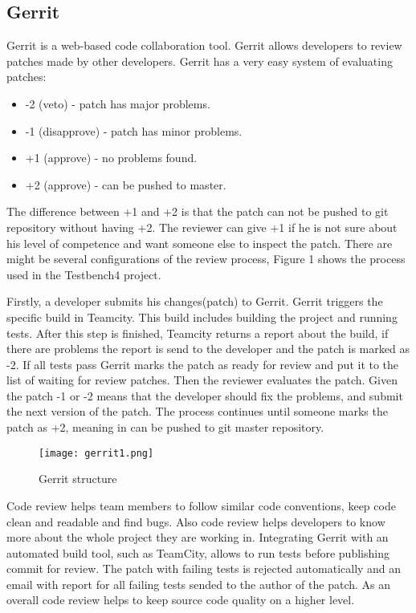 \subsection{Gerrit}
  Gerrit is a web-based code collaboration tool. Gerrit allows developers to
  review patches made by other developers. Gerrit has a very easy system of evaluating patches:
  \begin{itemize}
  \item -2 (veto) - patch has major problems.
  \item -1 (disapprove) - patch has minor problems.
  \item +1 (approve) - no problems found.
  \item +2 (approve) - can be pushed to master.
  \end{itemize}
  
  The difference between +1 and +2 is that the patch can not be pushed to git
  repository without having +2. The reviewer can give +1 if he is not sure about his level of competence
  and want someone else to inspect the patch. There are might be several configurations of the review process,
  Figure 1 shows the process used in the Testbench4 project.

  Firstly, a developer submits his changes(patch) to Gerrit. Gerrit triggers the
  specific build in Teamcity. This build includes building the project and
  running tests. After this step is finished, Teamcity returns a report about the build, if there are problems 
  the report is send to the developer and the patch is marked as -2. If all
  tests pass Gerrit marks the patch as ready for review and put it to the list
  of waiting for review patches.
  Then the reviewer evaluates the patch. Given the patch -1 or -2 means that the developer should fix the problems,
  and submit the next version of the patch. The process continues until someone
  marks the patch as +2,  meaning in can be pushed to git master repository.
    \begin{figure}
      \texttt{[image: gerrit1.png]}
      \caption{Gerrit structure}
    \end{figure}
  Code review helps team members to follow similar code conventions, 
  keep code clean and readable and find bugs. Also code review helps developers to know more about 
  the whole project they are working in. Integrating Gerrit with an automated build tool, 
  such as TeamCity, allows to run tests before publishing commit for review. 
  The patch with failing tests is rejected automatically and an email with report for all failing tests sended 
  to the author of the patch. As an overall code review helps to keep source code quality on a higher level.


